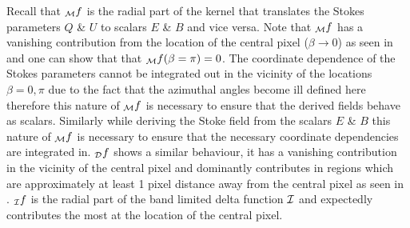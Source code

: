 Recall that ${_{\mathcal{M}}f}$ is the radial part of the kernel that translates the Stokes parameters $Q$ \& $U$ to scalars $E$ \& $B$ and vice versa. Note that ${_{\mathcal{M}}f}$ has a vanishing contribution from the location of the central pixel ($\beta \rightarrow 0$) as seen in  and one can show that that ${_{\mathcal{M}}f(\beta=\pi)}=0$. The coordinate dependence of the Stokes parameters cannot be integrated out in the vicinity of the locations $\beta=0,\pi$ due to the fact that the azimuthal angles become ill defined here therefore this nature of ${_{\mathcal{M}}f}$ is necessary to ensure that the derived fields behave as scalars. Similarly while deriving the Stoke field from the scalars $E$ \& $B$ this nature of ${_{\mathcal{M}}f}$ is necessary to ensure that the necessary coordinate dependencies are integrated in. ${_{\mathcal{D}}f}$ shows a similar behaviour, it has a vanishing contribution in the vicinity of the central pixel and dominantly contributes in regions which are approximately at least 1 pixel distance away from the central pixel as seen in . ${_{\mathcal{I}}f}$ is the radial part of the band limited delta function $\mathcal{I}$ and expectedly contributes the most at the location of the central pixel. 



